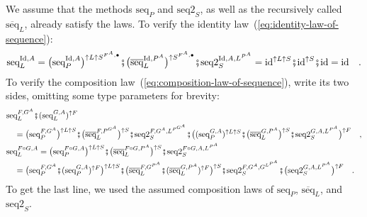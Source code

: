 We assume that the methods $\text{seq}_{P}$ and $\text{seq2}_{S}$,
as well as the recursively called $\overline{\text{seq}}_{L}$, already
satisfy the laws. To verify the identity law~(\ref{eq:identity-law-of-sequence}):
\[
\text{seq}_{L}^{\text{Id},A}=\big(\text{seq}_{P}^{\text{Id},A}\big)^{\uparrow L\uparrow S^{F^{A},\bullet}}\bef\big(\overline{\text{seq}}_{L}^{\text{Id},P^{A}}\big)^{\uparrow S^{F^{A},\bullet}}\bef\text{seq2}_{S}^{\text{Id},A,L^{P^{A}}}=\text{id}^{\uparrow L\uparrow S}\bef\text{id}^{\uparrow S}\bef\text{id}=\text{id}\quad.
\]
To verify the composition law~(\ref{eq:composition-law-of-sequence}),
write its two sides, omitting some type parameters for brevity:
\begin{align*}
 & \text{seq}_{L}^{F,G^{A}}\bef(\text{seq}_{L}^{G,A})^{\uparrow F}\\
 & \quad=\big(\text{seq}_{P}^{F,G^{A}}\big)^{\uparrow L\uparrow S}\bef\big(\overline{\text{seq}}_{L}^{F,P^{G^{A}}}\big)^{\uparrow S}\bef\text{seq2}_{S}^{F,G^{A},L^{P^{G^{A}}}}\bef\big((\text{seq}_{P}^{G,A})^{\uparrow L\uparrow S}\bef\big(\overline{\text{seq}}_{L}^{G,P^{A}}\big)^{\uparrow S}\bef\text{seq2}_{S}^{G,A,L^{P^{A}}}\big)^{\uparrow F}\quad,\\
 & \text{seq}_{L}^{F\circ G,A}=\big(\text{seq}_{P}^{F\circ G,A}\big)^{\uparrow L\uparrow S}\bef\big(\overline{\text{seq}}_{L}^{F\circ G,P^{A}}\big)^{\uparrow S}\bef\text{seq2}_{S}^{F\circ G,A,L^{P^{A}}}\\
 & \quad=\big(\text{seq}_{P}^{F,G^{A}}\bef(\text{seq}_{P}^{G,A})^{\uparrow F}\big)^{\uparrow L\uparrow S}\bef\big(\overline{\text{seq}}_{L}^{F,G^{P^{A}}}\bef(\overline{\text{seq}}_{L}^{G,P^{A}})^{\uparrow F}\big)^{\uparrow S}\bef\text{seq2}_{S}^{F,G^{A},G^{L^{P^{A}}}}\bef\big(\text{seq2}_{S}^{G,A,L^{P^{A}}}\big)^{\uparrow F}\quad.
\end{align*}
To get the last line, we used the assumed composition laws of $\text{seq}_{P}$,
$\overline{\text{seq}}_{L}$, and $\text{seq2}_{S}$. 

